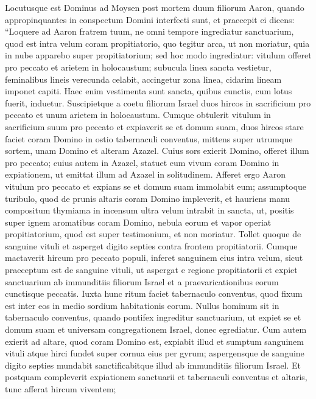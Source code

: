 \begin{biblechapter}  
\verse Locutusque est Dominus ad Moysen post mortem duum filiorum Aaron, quando appropinquantes in conspectum Domini interfecti sunt, 
\verse et praecepit ei dicens: “Loquere ad Aaron fratrem tuum, ne omni tempore ingrediatur sanctuarium, quod est intra velum coram propitiatorio, quo tegitur arca, ut non moriatur, quia in nube apparebo super propitiatorium; 
\verse sed hoc modo ingrediatur: vitulum offeret pro peccato et arietem in holocaustum; 
\verse subucula linea sancta vestietur, feminalibus lineis verecunda celabit, accingetur zona linea, cidarim lineam imponet capiti. Haec enim vestimenta sunt sancta, quibus cunctis, cum lotus fuerit, induetur. 
\verse Suscipietque a coetu filiorum Israel duos hircos in sacrificium pro peccato et unum arietem in holocaustum. 
\verse Cumque obtulerit vitulum in sacrificium suum pro peccato et expiaverit se et domum suam, 
\verse duos hircos stare faciet coram Domino in ostio tabernaculi conventus, 
\verse mittens super utrumque sortem, unam Domino et alteram Azazel. 
\verse Cuius sors exierit Domino, offeret illum pro peccato; 
\verse cuius autem in Azazel, statuet eum vivum coram Domino in expiationem, ut emittat illum ad Azazel in solitudinem. 
\verse Afferet ergo Aaron vitulum pro peccato et expians se et domum suam immolabit eum; 
\verse assumptoque turibulo, quod de prunis altaris coram Domino impleverit, et hauriens manu compositum thymiama in incensum ultra velum intrabit in sancta, 
\verse ut, positis super ignem aromatibus coram Domino, nebula eorum et vapor operiat propitiatorium, quod est super testimonium, et non moriatur. 
\verse Tollet quoque de sanguine vituli et asperget digito septies contra frontem propitiatorii. 
\verse Cumque mactaverit hircum pro peccato populi, inferet sanguinem eius intra velum, sicut praeceptum est de sanguine vituli, ut aspergat e regione propitiatorii 
\verse et expiet sanctuarium ab immunditiis filiorum Israel et a praevaricationibus eorum cunctisque peccatis. Iuxta hunc ritum faciet tabernaculo conventus, quod fixum est inter eos in medio sordium habitationis eorum. 
\verse Nullus hominum sit in tabernaculo conventus, quando pontifex ingreditur sanctuarium, ut expiet se et domum suam et universam congregationem Israel, donec egrediatur. 
\verse Cum autem exierit ad altare, quod coram Domino est, expiabit illud et sumptum sanguinem vituli atque hirci fundet super cornua eius per gyrum; 
\verse aspergensque de sanguine digito septies mundabit sanctificabitque illud ab immunditiis filiorum Israel. 
\verse Et postquam compleverit expiationem sanctuarii et tabernaculi conventus et altaris, tunc afferat hircum viventem; 

\end{biblechapter}
